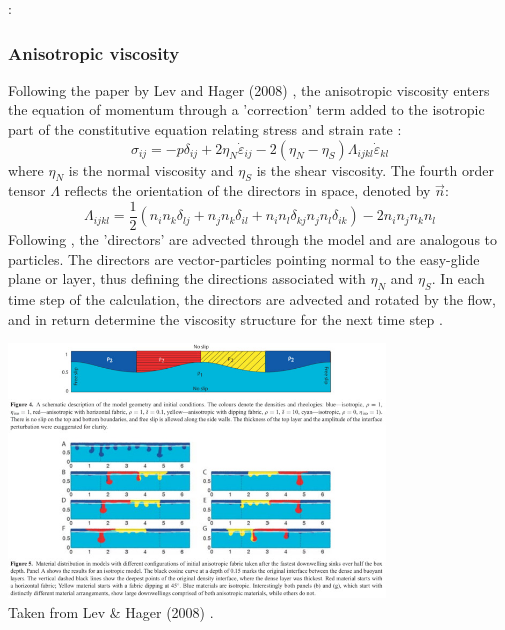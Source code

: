 \Literature: \cite{hoor89,lopr90,homo90,scps01,lova01,anpa19,egat10}


































\subsubsection{Anisotropic viscosity}

Following the paper by Lev and Hager (2008) \cite{leha08}, 
the anisotropic viscosity enters the equation of momentum through a 'correction'
term added to the isotropic part of the constitutive equation relating
stress and strain rate \cite{mumh02}:
\[
\sigma_{ij} = -p \delta_{ij} + 2 \eta_N \dot{\varepsilon}_{ij}  - 2(\eta_N-\eta_S)\Lambda_{ijkl}\dot{\varepsilon}_{kl} 
\]
where $\eta_N$ is the normal viscosity and $\eta_S$ is the shear viscosity. 
The fourth order tensor $\Lambda$ reflects the orientation of the directors in space, 
denoted by $\vec{n}$:
\[
\Lambda_{ijkl}=\frac{1}{2} (n_i n_k \delta_{lj} + n_j n_k \delta_{il} 
+ n_i n_l \delta_{kj} n_j n_l \delta_{ik} )
- 2 n_i n_j n_k n_l 
\]
Following \cite{modm03,mumh02}, the 'directors' are advected through the model and are 
analogous to particles. The directors are
vector-particles pointing normal to the easy-glide plane or layer,
thus defining the directions associated with $\eta_N$ and $\eta_S$. 
In each time step of the calculation, the directors are advected and rotated by the
flow, and in return determine the viscosity structure for the next time
step \cite{mumc04}.

\begin{center}
\includegraphics[width=10cm]{images/rheology/leha08}\\
{\captionfont Taken from Lev \& Hager (2008) \cite{leha08}.}
\end{center}

